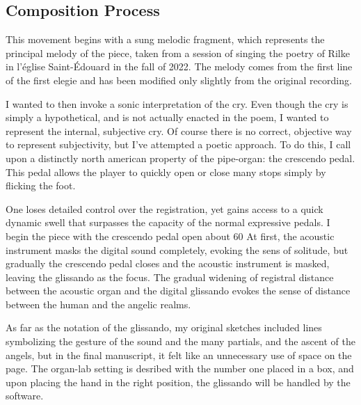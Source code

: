 \documentclass[12pt,twoside,maitrise]{dms_ks}
\theoremstyle{definition}
\begin{document}
\subsection{Composition Process}

This movement begins with a sung melodic fragment, which represents the principal melody of the piece, taken from a session of singing the poetry of Rilke in l'église Saint-Édouard in the fall of 2022.
The melody comes from the first line of the first elegie and has been modified only slightly from the original recording. 


I wanted to then invoke a sonic interpretation of the cry.
Even though the cry is simply a hypothetical, and is not actually enacted in the poem, I wanted to represent the internal, subjective cry.
Of course there is no correct, objective way to represent subjectivity, but I've attempted a poetic approach.
To do this, I call upon a distinctly north american property of the pipe-organ: the crescendo pedal.
This pedal allows the player to quickly open or close many stops simply by flicking the foot.

One loses detailed control over the registration, yet gains access to a quick dynamic swell that surpasses the capacity of the normal expressive pedals.
I begin the piece with the crescendo pedal open about 60%
At first, the acoustic instrument masks the digital sound completely, evoking the sens of solitude, but gradually the crescendo pedal closes and the acoustic instrument is masked, leaving the glissando as the focus.
The gradual widening of registral distance between the acoustic organ and the digital glissando evokes the sense of distance between the human and the angelic realms.

As far as the notation of the glissando, my original sketches included lines symbolizing the gesture of the sound and the many partials, and the ascent of the angels, but in the final manuscript, it felt like an unnecessary use of space on the page.
The organ-lab setting is desribed with the number one placed in a box, and upon placing the hand in the right position, the glissando will be handled by the software.

\end{document}
